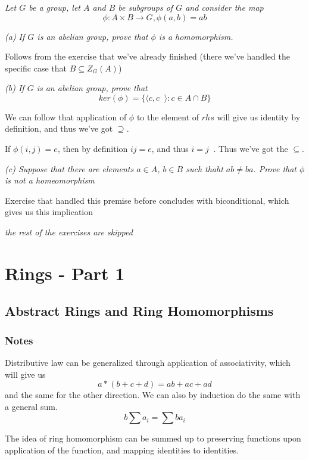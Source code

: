 \documentclass[11pt,oneside,titlepage]{book}
\DeclareMathOperator \inv {^{-1}}
\newcommand{\eangle}[1]{\langle #1 \rangle}
\newcommand{\set}[1]{\{ #1 \}}
\begin{document}
\subsection{}

\textit{Let $G$ be a group, let $A$ and $B$ be subgroups of $G$ and
consider the map
  $$\phi: A \times B \to G, \phi(a, b) = ab$$}

\textit{(a) If $G$ is an abelian group, prove that $\phi$ is a
homomorphism.}

Follows from the exercise that we've already finished (there we've
handled the specific case that $B \subseteq Z_G(A)$)

\textit{(b) If $G$ is an abelian group, prove that
  $$ker(\phi) = \set{\eangle{c, c\inv}: c \in A \cap B}$$}

We can follow that application of $\phi$ to the element of $rhs$ will
give us identity by definition, and thus we've got $\supseteq$.

If $\phi(i, j) = e$, then by definition $i j = e$, and thus $i =
j\inv$. Thus we've got the $\subseteq$.

\textit{(c) Suppose that there are elements $a \in A$, $b \in B$ such
thaht $ab \neq ba$.  Prove that $\phi$ is not a homeomorphism}

Exercise that handled this premise before concludes with
biconditional, which gives us this implication

\textit{the rest of the exercises are skipped}

\chapter{Rings - Part 1}

\section{Abstract Rings and Ring Homomorphisms}

\subsection*{Notes}

Distributive law can be generalized through application of
associativity, which will give us
$$a * (b + c + d) = ab + ac + ad$$
and the same for the other direction. We can also by induction do the
same with a general sum.
$$b \sum{a_i} = \sum{b a_i}$$

The idea of ring homomorphism can be summed up to preserving functions
upon application of the function, and mapping identities to
identities.
\end{document}
